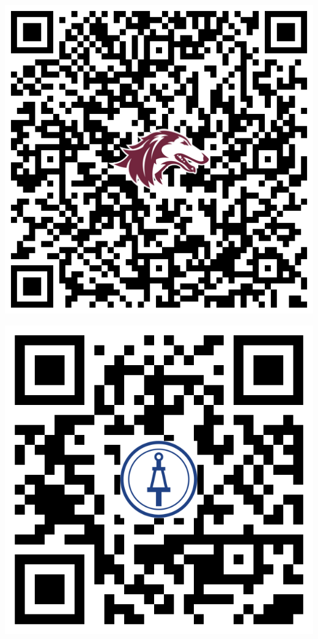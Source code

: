 \documentclass[12pt]{extarticle}
\begin{document}
\bigskip
\begin{minipage}{0.45\textwidth}
    \centering 
        \includegraphics[scale=0.182]{saluki-qr.png}
\end{minipage}
\hfill 
\begin{minipage}{0.45\textwidth}
    \centering 
        \includegraphics[scale=0.15]{tbp-qr.png}
\end{minipage}
\end{document}
